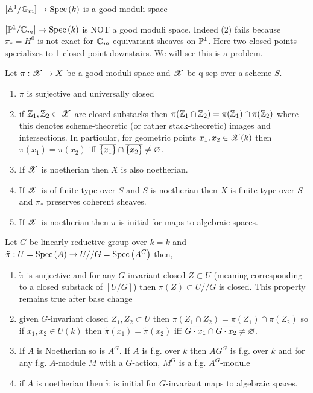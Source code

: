 \documentclass[12pt]{article}
\begin{document}
\begin{example}
$[\A^1 / \Gm] \to \Spec{k}$ is a good moduli space
\end{example}

\begin{example}
$[\P^1 / \Gm] \to \Spec{k}$ is NOT a good moduli space. Indeed (2) fails because $\pi_* = H^0$ is not exact for $\Gm$-equivariant sheaves on $\P^1$. Here two closed points specializes to 1 closed point downstairs. We will see this is a problem. 
\end{example}

\begin{theorem}
Let $\pi : \X \to X$ be a good moduli space and $\X$ be q-sep over a scheme $S$.
\begin{enumerate}
\item $\pi$ is surjective and universally closed
\item if $\Z_1, \Z_2 \subset \X$ are closed substacks then $\pi(\Z_1 \cap \Z_2) = \pi(\Z_1) \cap \pi(\Z_2)$ where this denotes scheme-theoretic (or rather stack-theoretic) images and intersections. In particular, for geometric points $x_1, x_2 \in \X(k)$ then $\pi(x_1) = \pi(x_2)$ iff $\overline{ \{ x_1 \} } \cap \overline{ \{ x_2 \} } \neq \empty$. 
\item If $\X$ is noetherian then $X$ is also noetherian.
\item If $\X$ is of finite type over $S$ and $S$ is noetherian then $X$ is finite type over $S$ and $\pi_*$ preserves coherent sheaves.

\item If $\X$ is noetherian then $\pi$ is initial for maps to algebraic spaces.
\end{enumerate}
\end{theorem}

\begin{cor}
Let $G$ be linearly reductive group over $k = \bar{k}$ and $\tilde{\pi} : U = \Spec{A} \to U // G = \Spec{A^G}$ then,
\begin{enumerate}
\item $\tilde{\pi}$ is surjective and for any $G$-invariant closed $Z \subset U$ (meaning corresponding to a closed substack of $[U / G]$) then $\pi(Z) \subset U // G$ is closed. This property remains true after base change
\item given $G$-invariant closed $Z_1, Z_2 \subset U$ then $\pi(Z_1 \cap Z_2) = \pi(Z_1) \cap \pi(Z_2)$ so if $x_1, x_2 \in U(k)$ then $\tilde{\pi}(x_1) = \tilde{\pi}(x_2)$ iff $\overline{G \cdot x_1} \cap \overline{G \cdot x_2} \neq \empty$.

\item If $A$ is Noetherian so is $A^G$. If $A$ is f.g. over $k$ then $AG^G$ is f.g. over $k$ and for any f.g. $A$-module $M$ with a $G$-action, $M^G$ is a f.g. $A^G$-module

\item if $A$ is noetherian then $\tilde{\pi}$ is initial for $G$-invariant maps to algebraic spaces.
\end{enumerate}
\end{cor}
\end{document}
